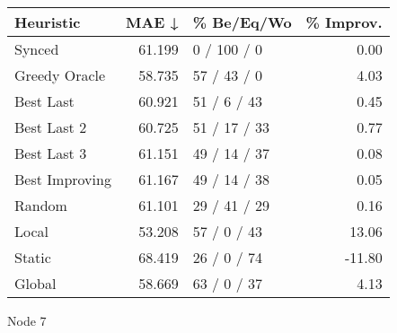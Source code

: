 \begin{tabular}{lrlr}
\toprule
\textbf{Heuristic} & \textbf{MAE ↓} & \textbf{\% Be/Eq/Wo} & \textbf{\% Improv.} \\
\midrule
            Synced &         61.199 &          0 / 100 / 0 &                0.00 \\
     Greedy Oracle &         58.735 &          57 / 43 / 0 &                4.03 \\
         Best Last &         60.921 &          51 / 6 / 43 &                0.45 \\
       Best Last 2 &         60.725 &         51 / 17 / 33 &                0.77 \\
       Best Last 3 &         61.151 &         49 / 14 / 37 &                0.08 \\
    Best Improving &         61.167 &         49 / 14 / 38 &                0.05 \\
            Random &         61.101 &         29 / 41 / 29 &                0.16 \\
             Local &         53.208 &          57 / 0 / 43 &               13.06 \\
            Static &         68.419 &          26 / 0 / 74 &              -11.80 \\
            Global &         58.669 &          63 / 0 / 37 &                4.13 \\
\bottomrule
\end{tabular}
\caption{Node 7}
\label{tab:non_lr05_le2_bs4_7}
